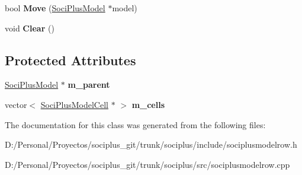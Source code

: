 \begin{DoxyCompactItemize}
\item 
\hypertarget{class_soci_plus_1_1_soci_plus_model_row_ad7756bafacd9fece21af8d3eabf3e61e}{bool {\bfseries Move} (\hyperlink{class_soci_plus_1_1_soci_plus_model}{Soci\+Plus\+Model} $\ast$model)}\label{class_soci_plus_1_1_soci_plus_model_row_ad7756bafacd9fece21af8d3eabf3e61e}

\item 
\hypertarget{class_soci_plus_1_1_soci_plus_model_row_a90cced13fc2a3e768e12a51602cf070b}{void {\bfseries Clear} ()}\label{class_soci_plus_1_1_soci_plus_model_row_a90cced13fc2a3e768e12a51602cf070b}

\end{DoxyCompactItemize}
\subsection*{Protected Attributes}
\begin{DoxyCompactItemize}
\item 
\hypertarget{class_soci_plus_1_1_soci_plus_model_row_a0d105c0cb61aa9269fa697f2091d2d73}{\hyperlink{class_soci_plus_1_1_soci_plus_model}{Soci\+Plus\+Model} $\ast$ {\bfseries m\+\_\+parent}}\label{class_soci_plus_1_1_soci_plus_model_row_a0d105c0cb61aa9269fa697f2091d2d73}

\item 
\hypertarget{class_soci_plus_1_1_soci_plus_model_row_af056d661786def3887b957ff713a2783}{vector$<$ \hyperlink{class_soci_plus_1_1_soci_plus_model_cell}{Soci\+Plus\+Model\+Cell} $\ast$ $>$ {\bfseries m\+\_\+cells}}\label{class_soci_plus_1_1_soci_plus_model_row_af056d661786def3887b957ff713a2783}

\end{DoxyCompactItemize}


The documentation for this class was generated from the following files\+:\begin{DoxyCompactItemize}
\item 
D\+:/\+Personal/\+Proyectos/sociplus\+\_\+git/trunk/sociplus/include/sociplusmodelrow.\+h\item 
D\+:/\+Personal/\+Proyectos/sociplus\+\_\+git/trunk/sociplus/src/sociplusmodelrow.\+cpp\end{DoxyCompactItemize}
